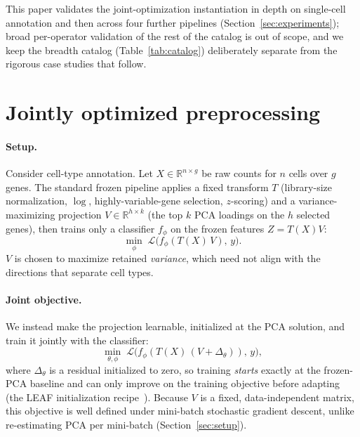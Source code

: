 \documentclass[10pt,twocolumn]{article}
\begin{document}
This paper validates the joint-optimization instantiation in depth on single-cell
annotation and then across four further pipelines (Section~\ref{sec:experiments}); broad
per-operator validation of the rest of the catalog is out of scope, and we keep the breadth
catalog (Table~\ref{tab:catalog}) deliberately separate from the rigorous case studies that
follow.

\section{Jointly optimized preprocessing}
\label{sec:method}

\paragraph{Setup.} Consider cell-type annotation. Let $X \in \mathbb{R}^{n \times g}$ be
raw counts for $n$ cells over $g$ genes. The standard frozen pipeline applies a fixed
transform $T$ (library-size normalization, $\log$, highly-variable-gene selection,
$z$-scoring) and a variance-maximizing projection $V \in \mathbb{R}^{h \times k}$ (the top
$k$ PCA loadings on the $h$ selected genes), then trains only a classifier $f_\phi$ on the
frozen features $Z = T(X)V$:
\begin{equation}
\min_{\phi}\; \mathcal{L}\big(f_\phi(T(X)\,V),\, y\big).
\end{equation}
$V$ is chosen to maximize retained \emph{variance}, which need not align with the
directions that separate cell types.

\paragraph{Joint objective.} We instead make the projection learnable, initialized at the
PCA solution, and train it jointly with the classifier:
\begin{equation}
\label{eq:joint}
\min_{\theta,\phi}\; \mathcal{L}\big(f_\phi(T(X)\,(V+\Delta_\theta)),\, y\big),
\end{equation}
where $\Delta_\theta$ is a residual initialized to zero, so training \emph{starts} exactly
at the frozen-PCA baseline and can only improve on the training objective before adapting
(the LEAF initialization recipe~\citep{zeghidour2021leaf}). Because $V$ is a fixed,
data-independent matrix, this objective is well defined under mini-batch stochastic
gradient descent, unlike re-estimating PCA per mini-batch (Section~\ref{sec:setup}).
\end{document}

